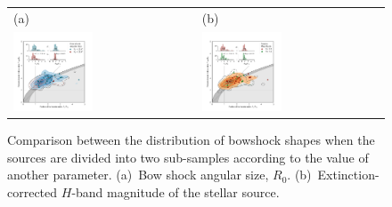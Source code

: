 \begin{figure}
  \centering
  \begin{tabular}{ll}
    (a) & (b) \\
    \includegraphics[width=0.45\textwidth]{figs/mipsgal-Rc-R90-R0} &
    \includegraphics[width=0.45\textwidth]{figs/mipsgal-Rc-R90-Mag} 
  \end{tabular}
  \caption[]{Comparison between the distribution of bowshock shapes
    when the sources are divided into two sub-samples according to the
    value of another parameter. (a)~Bow shock angular size, \(R_0\).
    (b)~Extinction-corrected \(H\)-band magnitude of the stellar
    source.}
  \label{fig:mipsgal-correlated}
\end{figure}


